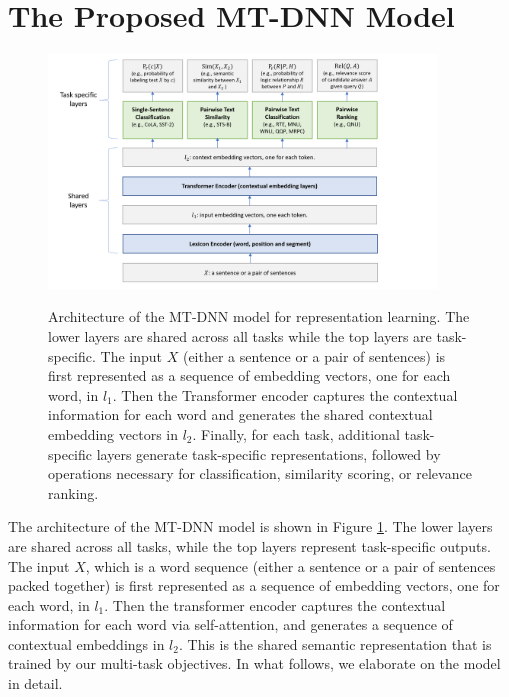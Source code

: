 \section{The Proposed MT-DNN Model}
\label{sec:mt-dnn}
\begin{figure}
	\centering
	\vspace{-1mm}
    {
	\includegraphics[width=0.92\textwidth]{fig/mt-dnn.png}
    }
	\caption{Architecture of the MT-DNN model for representation learning. The lower layers are shared across all tasks while the top layers are task-specific. The input $X$ (either a sentence or a pair of sentences) is first represented as a sequence of embedding vectors, one for each word, in $l_1$. Then the Transformer encoder captures the contextual information for each word and generates the shared contextual embedding vectors in $l_2$. Finally, for each task, additional task-specific layers generate task-specific representations, followed by operations necessary for classification, similarity scoring, or relevance ranking.}
	\label{fig:mt-dnn}
\end{figure}


The architecture of the MT-DNN model is shown in Figure \ref{fig:mt-dnn}. The lower layers are shared across all tasks, while the top layers represent task-specific outputs. The input $X$, which is a word sequence (either a sentence or a pair of sentences packed together) is first represented as a sequence of embedding vectors, one for each word, in $l_1$. Then the transformer encoder captures the contextual information for each word via self-attention, and generates a sequence of contextual embeddings in $l_2$. This is the shared semantic representation that is trained by our multi-task objectives.  In what follows, we elaborate on the model in detail.

